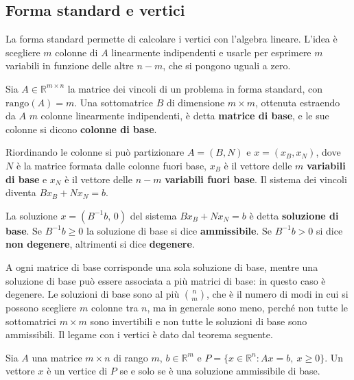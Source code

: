 \subsection{Forma standard e vertici}
La forma standard permette di calcolare i vertici con l'algebra lineare. L'idea è scegliere $m$ colonne di $A$ linearmente indipendenti e usarle per esprimere $m$ variabili in funzione delle altre $n - m$, che si pongono uguali a zero.

\begin{definizione}\label{def:base}
Sia $A \in \mathbb{R}^{m \times n}$ la matrice dei vincoli di un problema in forma standard, con $\mathrm{rango}(A) = m$. Una sottomatrice $B$ di dimensione $m \times m$, ottenuta estraendo da $A$ $m$ colonne linearmente indipendenti, è detta \textbf{matrice di base}, e le sue colonne si dicono \textbf{colonne di base}.
\end{definizione}

Riordinando le colonne si può partizionare $A = (B, N)$ e $x = (x_B, x_N)$, dove $N$ è la matrice formata dalle colonne fuori base, $x_B$ è il vettore delle $m$ \textbf{variabili di base} e $x_N$ è il vettore delle $n - m$ \textbf{variabili fuori base}. Il sistema dei vincoli diventa $B x_B + N x_N = b$.

\begin{definizione}\label{def:sol-base}
La soluzione $x = (B^{-1} b,\, 0)$ del sistema $B x_B + N x_N = b$ è detta \textbf{soluzione di base}. Se $B^{-1} b \ge 0$ la soluzione di base si dice \textbf{ammissibile}. Se $B^{-1} b > 0$ si dice \textbf{non degenere}, altrimenti si dice \textbf{degenere}.
\end{definizione}

A ogni matrice di base corrisponde una sola soluzione di base, mentre una soluzione di base può essere associata a più matrici di base: in questo caso è degenere. Le soluzioni di base sono al più $\binom{n}{m}$, che è il numero di modi in cui si possono scegliere $m$ colonne tra $n$, ma in generale sono meno, perché non tutte le sottomatrici $m \times m$ sono invertibili e non tutte le soluzioni di base sono ammissibili. Il legame con i vertici è dato dal teorema seguente.

\begin{teorema}\label{teo:vertici-base}
Sia $A$ una matrice $m \times n$ di rango $m$, $b \in \mathbb{R}^m$ e $P = \{x \in \mathbb{R}^n : A x = b,\ x \ge 0\}$. Un vettore $x$ è un vertice di $P$ se e solo se è una soluzione ammissibile di base.
\end{teorema}


